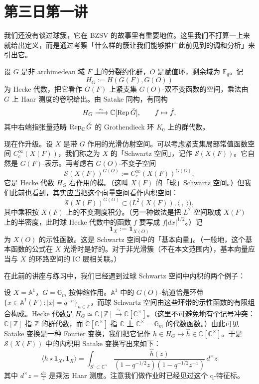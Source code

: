 \section{第三日第一讲}

我们还没有谈过球簇，它在 BZSV 的故事里有重要地位。这里我们不打算一上来就给出定义，而是通过考察「什么样的簇让我们能够推广此前见到的调和分析」来引出它。

设 $G$ 是非 archimedean 域 $F$ 上的分裂约化群，$O$ 是赋值环，剩余域为 $\mathbb F_q$。记
\[
  H_G:=H(G(F),G(O))
\]
为 Hecke 代数，把它看作 $G(F)$ 上紧支集 $G(O)$-双不变函数的空间，乘法由 $G$ 上 Haar 测度的卷积给出。由 Satake 同构，有同构
\[
  H_G\xrightarrow{\ \sim\ }\mathbb C[\operatorname{Rep}\check G],\qquad f\mapsto\hat f,
\]
其中右端指张量范畴 $\operatorname{Rep}_{\mathbb C}\check G$ 的 Grothendieck 环 $K_0$ 上的群代数。

现在作升级。设 $X$ 是带 $G$ 作用的光滑仿射空间。可以考虑紧支集局部常值函数空间 $C_c^\infty(X(F))$，我们称之为 $X$ 的「Schwartz 空间」，记作 $\mathcal S(X(F))$。它自然是 $G(F)$-表示。再考虑右 $G(O)$-不变子空间
\[
  \mathcal S(X(F))^{G(O)}:=C_c^\infty(X(F))^{G(O)},
\]
它是 Hecke 代数 $H_G$ 右作用的模。（这叫 $X(F)$ 的「球」Schwartz 空间。）但我们此前也看到，其实应当把这个向量空间看作内积空间：
\[
  \mathcal S(X(F))^{G(O)}\subset\big(L^2(X(F)),\langle\ ,\ \rangle\big),
\]
其中乘积按 $X(F)$ 上的不变测度积分。（另一种做法是把 $L^2$ 空间取成 $X(F)$ 上的半密度，此时球 Hecke 代数中的函数 $f$ 要写成 $f|dx|^{1/2}$。）记
\[
  \mathbf 1_X:=\mathbf 1_{X(O)}
\]
为 $X(O)$ 的示性函数。这是 Schwartz 空间中的「基本向量」。（一般地，这个基本函数的公式在 $X$ 光滑时是好的。对于非光滑簇（不在本文范围内），基本向量应当与 $X$ 的环路空间的 IC 层相关联。）

在此前的讲座与练习中，我们已经遇到过球 Schwartz 空间中内积的两个例子：

\begin{exmp}
  设 $X=\mathbb A^1$，$G=\mathbb G_m$ 按伸缩作用。$\mathbb A^1$ 中的 $G(O)$-轨道恰是环带 $\{x\in\mathbb A^1(F):|x|=q^{-n}\}_{n\in\mathbb Z}$，而球 Schwartz 空间由这些环带的示性函数的有限组合构成。Hecke 代数是 $H_G\simeq\mathbb C[\mathbb Z]\xrightarrow{\sim}\mathbb C[\mathbb C^\times]$。（这里不可避免地有个记号冲突：$\mathbb C[\mathbb Z]$ 指 $\mathbb Z$ 的群代数，而 $\mathbb C[\mathbb C^\times]$ 指 $\mathbb C$ 上 $\mathbb C^\times=\mathbb G_m$ 的代数函数。）由此可见 Satake 变换是一种 Fourier 变换，我们把它记作 $h\in H_G\mapsto\hat h\in\mathbb C[\mathbb C^\times]$。于是 $\mathcal S(X(F))$ 中的内积用 Satake 变换写出来如下：
  \begin{equation}
    \langle h\star\mathbf 1_X,\mathbf 1_X\rangle
    =\int_{S^1\subset\mathbb C^\times}\frac{\hat h(z)}{(1-q^{-1/2}z)(1-q^{-1/2}z^{-1})}\,d^\times z
    \label{eq:8-2}
  \end{equation}
  其中 $d^\times z=\frac{dz}{z}$ 是乘法 Haar 测度。注意我们做作业时已经见过这个 q-特征标。
\end{exmp}


